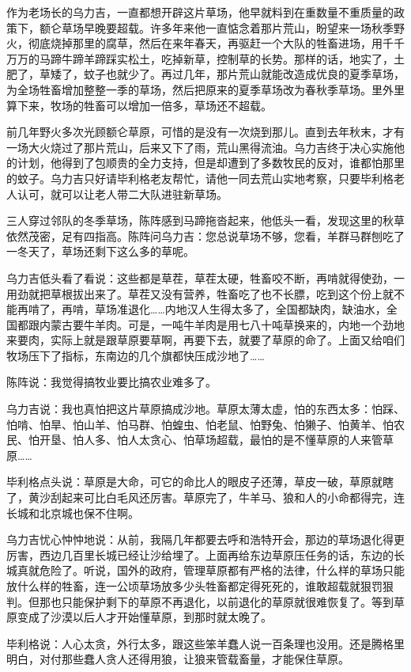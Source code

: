 \par 作为老场长的乌力吉，一直都想开辟这片草场，他早就料到在重数量不重质量的政策下，额仑草场早晚要超载。许多年来他一直惦念着那片荒山，盼望来一场秋季野火，彻底烧掉那里的腐草，然后在来年春天，再驱赶一个大队的牲畜进场，用千千万万的马蹄牛蹄羊蹄踩实松土，吃掉新草，控制草的长势。那样的话，地实了，土肥了，草矮了，蚊子也就少了。再过几年，那片荒山就能改造成优良的夏季草场，为全场牲畜增加整整一季的草场，然后把原来的夏季草场改为春秋季草场。里外里算下来，牧场的牲畜可以增加一倍多，草场还不超载。
\par 前几年野火多次光顾额仑草原，可惜的是没有一次烧到那儿。直到去年秋末，才有一场大火烧过了那片荒山，后来又下了雨，荒山黑得流油。乌力吉终于决心实施他的计划，他得到了包顺贵的全力支持，但是却遭到了多数牧民的反对，谁都怕那里的蚊子。乌力吉只好请毕利格老友帮忙，请他一同去荒山实地考察，只要毕利格老人认可，就可以让老人带二大队进驻新草场。
\par 三人穿过邻队的冬季草场，陈阵感到马蹄拖沓起来，他低头一看，发现这里的秋草依然茂密，足有四指高。陈阵问乌力吉：您总说草场不够，您看，羊群马群刨吃了一冬天了，草场还剩下这么多的草呢。
\par 乌力吉低头看了看说：这些都是草茬，草茬太硬，牲畜咬不断，再啃就得使劲，一用劲就把草根拔出来了。草茬又没有营养，牲畜吃了也不长膘，吃到这个份上就不能再啃了，再啃，草场准退化……内地汉人生得太多了，全国都缺肉，缺油水，全国都跟内蒙古要牛羊肉。可是，一吨牛羊肉是用七八十吨草换来的，内地一个劲地来要肉，实际上就是跟草原要草啊，再要下去，就要了草原的命了。上面又给咱们牧场压下了指标，东南边的几个旗都快压成沙地了……
\par 陈阵说：我觉得搞牧业要比搞农业难多了。
\par 乌力吉说：我也真怕把这片草原搞成沙地。草原太薄太虚，怕的东西太多：怕踩、怕啃、怕旱、怕山羊、怕马群、怕蝗虫、怕老鼠、怕野兔、怕獭子、怕黄羊、怕农民、怕开垦、怕人多、怕人太贪心、怕草场超载，最怕的是不懂草原的人来管草原……
\par 毕利格点头说：草原是大命，可它的命比人的眼皮子还薄，草皮一破，草原就瞎了，黄沙刮起来可比白毛风还厉害。草原完了，牛羊马、狼和人的小命都得完，连长城和北京城也保不住啊。
\par 乌力吉忧心忡忡地说：从前，我隔几年都要去呼和浩特开会，那边的草场退化得更厉害，西边几百里长城已经让沙给埋了。上面再给东边草原压任务的话，东边的长城真就危险了。听说，国外的政府，管理草原都有严格的法律，什么样的草场只能放什么样的牲畜，连一公顷草场放多少头牲畜都定得死死的，谁敢超载就狠罚狠判。但那也只能保护剩下的草原不再退化，以前退化的草原就很难恢复了。等到草原变成了沙漠以后人才开始懂草原，到那时就太晚了。
\par 毕利格说：人心太贪，外行太多，跟这些笨羊蠢人说一百条理也没用。还是腾格里明白，对付那些蠢人贪人还得用狼，让狼来管载畜量，才能保住草原。
